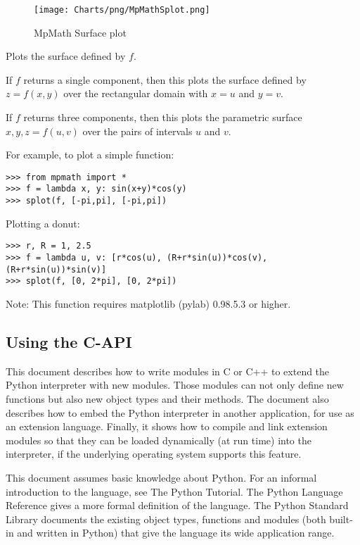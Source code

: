 \begin{figure}[ht]
	\centering
	\texttt{[image: Charts/png/MpMathSplot.png]}
	\caption{MpMath Surface plot}
	\label{Fig MpMath Surface plot}
\end{figure}


Plots the surface defined by $f$.

\vpara
If $f$ returns a single component, then this plots the surface defined by $z=f(x,y)$ over the rectangular domain with $x=u$  and $y=v$.

\vpara
If $f$ returns three components, then this plots the parametric surface $x,y,z = f(u,v)$ over the pairs of intervals $u$ and $v$.

\vpara
For example, to plot a simple function:

\begin{lstlisting}
>>> from mpmath import *
>>> f = lambda x, y: sin(x+y)*cos(y)
>>> splot(f, [-pi,pi], [-pi,pi])
\end{lstlisting}


Plotting a donut:

\begin{lstlisting}
>>> r, R = 1, 2.5
>>> f = lambda u, v: [r*cos(u), (R+r*sin(u))*cos(v), (R+r*sin(u))*sin(v)]
>>> splot(f, [0, 2*pi], [0, 2*pi])
\end{lstlisting}


Note: This function requires matplotlib (pylab) 0.98.5.3 or higher.


\subsection{Using the C-API}

This document describes how to write modules in C or C++ to extend the Python interpreter with new modules. Those modules can not only define new functions but also new object types and their methods. The document also describes how to embed the Python interpreter in another application, for use as an extension language. Finally, it shows how to compile and link extension modules so that they can be loaded dynamically (at run time) into the interpreter, if the underlying operating system supports this feature.

This document assumes basic knowledge about Python. For an informal introduction to the language, see The Python Tutorial. The Python Language Reference gives a more formal definition of the language. The Python Standard Library documents the existing object types, functions and modules (both built-in and written in Python) that give the language its wide application range.

